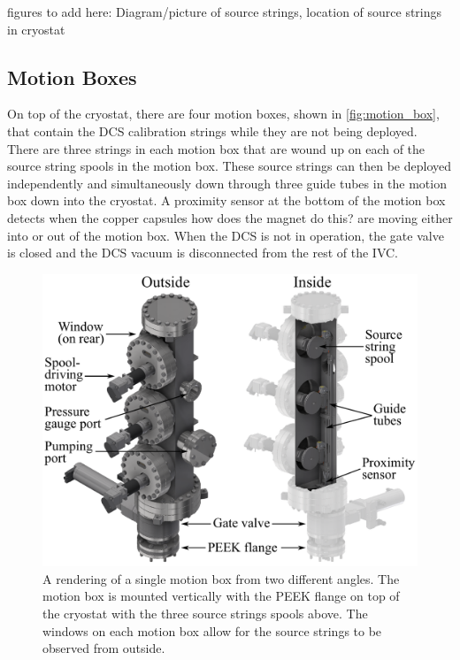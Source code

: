 figures to add here: Diagram/picture of source strings, location of source strings in cryostat
\subsection{Motion Boxes}
On top of the cryostat, there are four motion boxes, shown in \autoref{fig:motion_box}, that contain the DCS calibration strings while they are not being deployed. There are three strings in each motion box that are wound up on each of the source string spools in the motion box. These source strings can then be deployed independently and simultaneously down through three guide tubes in the motion box down into the cryostat. A proximity sensor at the bottom of the motion box detects when the copper capsules \color{red} how does the magnet do this? \color{black} are moving either into or out of the motion box. When the DCS is not in operation, the gate valve is closed and the DCS vacuum is disconnected from the rest of the IVC.
\begin{figure}[htpb]
\includegraphics[width=0.9\linewidth]{Figures/motion_box.pdf}
\caption[A rendering of a single motion box from two different angles.]{A rendering of a single motion box from two different angles. The motion box is mounted vertically with the PEEK flange on top of the cryostat with the three source strings spools above. The windows on each motion box allow for the source strings to be observed from outside.}
\label{fig:motion_box}
\end{figure}


